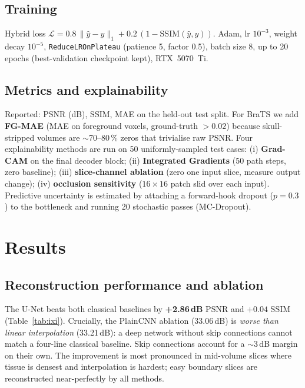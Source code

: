 \documentclass[10pt,a4paper]{article}
\begin{document}
\subsection{Training}
Hybrid loss
$\mathcal{L} = 0.8\,\lVert \hat{y}-y\rVert_{1} + 0.2\,(1-\mathrm{SSIM}(\hat{y},y))$.
Adam, lr $10^{-3}$, weight decay $10^{-5}$, \texttt{ReduceLROnPlateau}
(patience 5, factor 0.5), batch size 8, up to 20 epochs (best-validation
checkpoint kept), RTX~5070~Ti.

\subsection{Metrics and explainability}
Reported: PSNR (dB), SSIM, MAE on the held-out test split. For BraTS we add
\textbf{FG-MAE} (MAE on foreground voxels, ground-truth $>0.02$) because
skull-stripped volumes are $\sim$70--80\,\% zeros that trivialise raw PSNR.
Four explainability methods are run on 50 uniformly-sampled test cases:
(i) \textbf{Grad-CAM} on the final decoder block;
(ii) \textbf{Integrated Gradients} (50 path steps, zero baseline);
(iii) \textbf{slice-channel ablation} (zero one input slice, measure output
change);
(iv) \textbf{occlusion sensitivity} ($16{\times}16$ patch slid over each
input). Predictive uncertainty is estimated by attaching a forward-hook
dropout ($p{=}0.3$) to the bottleneck and running 20 stochastic passes
(MC-Dropout).

\section{Results}

\subsection{Reconstruction performance and ablation}
The U-Net beats both classical baselines by \textbf{+2.86\,dB} PSNR and
$+0.04$ SSIM (Table~\ref{tab:ixi}). Crucially, the PlainCNN ablation
(33.06\,dB) is \emph{worse than linear interpolation} (33.21\,dB): a deep
network without skip connections cannot match a four-line classical
baseline. Skip connections account for a $\sim$3\,dB margin on their own.
The improvement is most pronounced in mid-volume slices where tissue is
densest and interpolation is hardest; easy boundary slices are reconstructed
near-perfectly by all methods.
\end{document}
